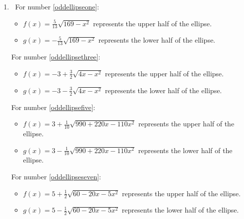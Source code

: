 \begin{enumerate}
\setcounter{enumi}{\value{HW}}

\item $~$
For number \ref{oddellipseone}:

\begin{itemize}

\item  $f(x) = \frac{5}{13} \sqrt{169-x^2}$ represents the upper half of the ellipse.

\item  $g(x) =  -\frac{5}{13} \sqrt{169-x^2}$   represents the lower half of the ellipse.

\end{itemize}


For number \ref{oddellipsethree}:

\begin{itemize}

\item  $f(x) = -3 + \frac{3}{2} \sqrt{4x-x^2}$ represents the upper half of the ellipse.

\item  $g(x) =   -3 - \frac{3}{2} \sqrt{4x-x^2}$   represents the lower half of the ellipse.

\end{itemize}


For number \ref{oddellipsefive}:

\begin{itemize}

\item  $f(x) = 3 + \frac{1}{10} \sqrt{990+220x-110x^2}$ represents the upper half of the ellipse.

\item  $g(x) =   3 - \frac{1}{10} \sqrt{990+220x-110x^2}$   represents the lower half of the ellipse.

\end{itemize}


For number \ref{oddellipseseven}:

\begin{itemize}

\item  $f(x) = 5 + \frac{1}{2} \sqrt{60-20x-5x^2}$ represents the upper half of the ellipse.

\item  $g(x) =  5 - \frac{1}{2} \sqrt{60-20x-5x^2}$  represents the lower half of the ellipse.

\end{itemize}



\end{enumerate}
